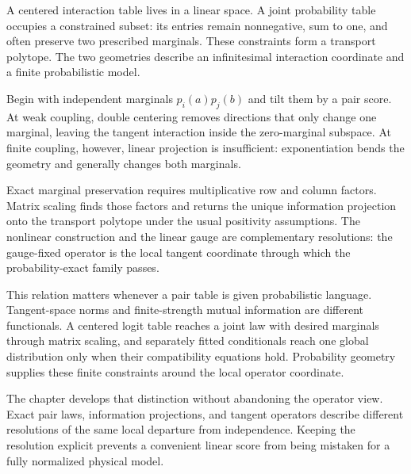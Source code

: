 A centered interaction table lives in a linear space.  A joint probability table occupies a
constrained subset: its entries remain nonnegative, sum to one, and often preserve two prescribed
marginals.  These constraints form a transport polytope.  The two geometries describe an
infinitesimal interaction coordinate and a finite probabilistic model.

Begin with independent marginals $p_i(a)p_j(b)$ and tilt them by a pair score.  At weak coupling,
double centering removes directions that only change one marginal, leaving the tangent interaction
inside the zero-marginal subspace.  At finite coupling, however, linear projection is insufficient:
exponentiation bends the geometry and generally changes both marginals.

Exact marginal preservation requires multiplicative row and column factors.  Matrix scaling finds
those factors and returns the unique information projection onto the transport polytope under the
usual positivity assumptions.  The nonlinear construction and the linear gauge are complementary
resolutions: the gauge-fixed operator is the local tangent coordinate through which the
probability-exact family passes.

This relation matters whenever a pair table is given probabilistic language.  Tangent-space norms
and finite-strength mutual information are different functionals.  A centered logit table reaches
a joint law with desired marginals through matrix scaling, and separately fitted conditionals reach
one global distribution only when their compatibility equations hold.  Probability geometry
supplies these finite constraints around the local operator coordinate.

The chapter develops that distinction without abandoning the operator view.  Exact pair laws,
information projections, and tangent operators describe different resolutions of the same local
departure from independence.  Keeping the resolution explicit prevents a convenient linear score
from being mistaken for a fully normalized physical model.
